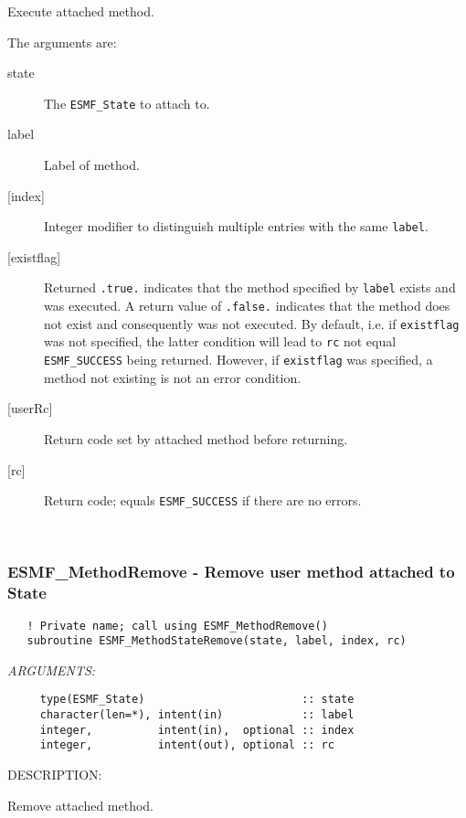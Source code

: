    Execute attached method.
  
   The arguments are:
   \begin{description}
   \item[state]
     The {\tt ESMF\_State} to attach to.
   \item[label]
     Label of method.
   \item[{[index]}]
     Integer modifier to distinguish multiple entries with the same {\tt label}.
   \item[{[existflag]}]
     Returned {\tt .true.} indicates that the method specified by {\tt label}
     exists and was executed. A return value of {\tt .false.} indicates that
     the method does not exist and consequently was not executed. By default,
     i.e. if {\tt existflag} was not specified, the latter condition will lead
     to {\tt rc} not equal {\tt ESMF\_SUCCESS} being returned. However, if
     {\tt existflag} was specified, a method not existing is not an error
     condition.
   \item[{[userRc]}]
     Return code set by attached method before returning.
   \item[{[rc]}]
     Return code; equals {\tt ESMF\_SUCCESS} if there are no errors.
   \end{description}
   
 
\mbox{}\hrulefill\ 
 
\subsubsection [ESMF\_MethodRemove] {ESMF\_MethodRemove - Remove user method attached to State}


  
\begin{verbatim}   ! Private name; call using ESMF_MethodRemove()
   subroutine ESMF_MethodStateRemove(state, label, index, rc)\end{verbatim}{\em ARGUMENTS:}
\begin{verbatim}     type(ESMF_State)                        :: state
     character(len=*), intent(in)            :: label
     integer,          intent(in),  optional :: index
     integer,          intent(out), optional :: rc \end{verbatim}
{\sf DESCRIPTION:\\ }


   Remove attached method.
  
